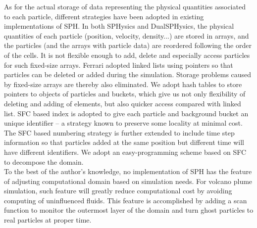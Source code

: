 \documentclass[procedia]{easychair}
\begin{document}
As for the actual storage of data representing the physical quantities associated to each particle, different strategies have been adopted in existing implementations of SPH. 
In both SPHysics and DualSPHysics\cite{crespo2015dualsphysics}, the physical quantities of each particle (position, velocity, density...) are stored in arrays, and the particles (and the arrays with particle data) are reordered following the order of the cells. It is not flexible enough to add, delete and especially access particles for such fixed-size arrays. Ferrari\cite{ferrari2009new} adopted linked lists using pointers so that particles can be deleted or added during the simulation. Storage problems caused by fixed-size arrays are thereby also eliminated. We adopt hash tables to store pointers to objects of particles and buckets, which give us not only flexibility of deleting and adding of elements, but also quicker access compared with linked list. SFC based index is adopted to give each particle and background bucket an unique identifier -- a strategy known to preserve some locality at minimal cost. The SFC based numbering strategy is further extended to include time step information so that particles added at the same position but different time will have different identifiers. 
We adopt an easy-programming scheme based on SFC \cite{patra1999efficient} to decompose the domain.\\
To the best of the author's knowledge, no implementation of SPH has the feature of adjusting computational domain based on simulation needs. For volcano plume simulation, such feature will greatly reduce computational cost by avoiding computing of uninfluenced fluids. This feature is accomplished by adding a scan function to monitor the outermost layer of the domain and turn ghost particles to real particles at proper time.\\
\end{document}
